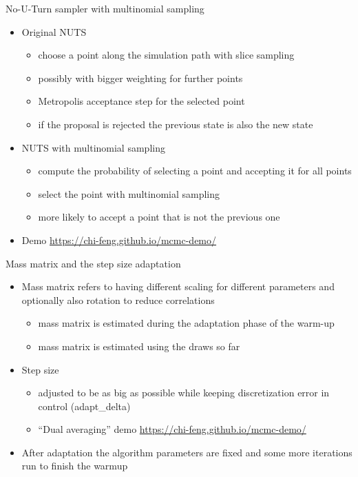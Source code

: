 \documentclass[finnish,english,t]{beamer}
\begin{document}
\begin{frame}{No-U-Turn sampler with multinomial sampling}

    \begin{itemize}
    \item Original NUTS
      \begin{itemize}
      \item choose a point along the simulation path with slice sampling
      \item possibly with bigger weighting for further points
      \item Metropolis acceptance step for the selected point
      \item if the proposal is rejected the previous state is also the
        new state
      \end{itemize}
    \item<2-> NUTS with multinomial sampling
      \begin{itemize}
      \item compute the probability of selecting a point and accepting
        it for all points
      \item select the point with multinomial sampling
      \item more likely to accept a point that is not the previous one
      \end{itemize}
    \item<3-> Demo \url{https://chi-feng.github.io/mcmc-demo/}
    \end{itemize}

\end{frame}


\begin{frame}{Mass matrix and the step size adaptation}

  \begin{itemize}
  \item Mass matrix refers to having different scaling for different
      parameters and optionally also rotation to reduce correlations
      \begin{itemize}
      \item mass matrix is estimated during the adaptation phase of
        the warm-up
      \item mass matrix is estimated using the draws so far
      \end{itemize}
    \item<2-> Step size
      \begin{itemize}
      \item adjusted to be as big as possible while keeping
        discretization error in control (adapt\_delta)
      \item ``Dual averaging'' demo \url{https://chi-feng.github.io/mcmc-demo/}
      \end{itemize}
    \item<3-> After adaptation the algorithm parameters are fixed and
      some more iterations run to finish the warmup
\end{itemize}

\end{frame}
\end{document}
